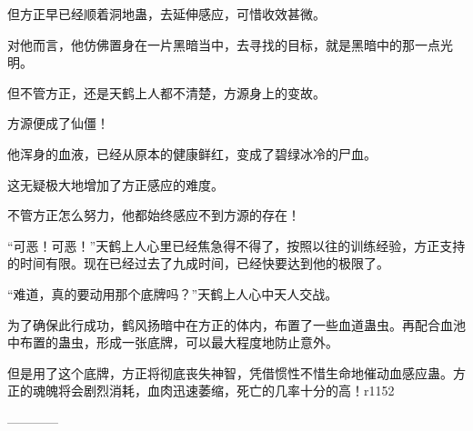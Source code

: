 \begin{this_body}
但方正早已经顺着洞地蛊，去延伸感应，可惜收效甚微。

对他而言，他仿佛置身在一片黑暗当中，去寻找的目标，就是黑暗中的那一点光明。

但不管方正，还是天鹤上人都不清楚，方源身上的变故。

方源便成了仙僵！

他浑身的血液，已经从原本的健康鲜红，变成了碧绿冰冷的尸血。

这无疑极大地增加了方正感应的难度。

不管方正怎么努力，他都始终感应不到方源的存在！

“可恶！可恶！”天鹤上人心里已经焦急得不得了，按照以往的训练经验，方正支持的时间有限。现在已经过去了九成时间，已经快要达到他的极限了。

“难道，真的要动用那个底牌吗？”天鹤上人心中天人交战。

为了确保此行成功，鹤风扬暗中在方正的体内，布置了一些血道蛊虫。再配合血池中布置的蛊虫，形成一张底牌，可以最大程度地防止意外。

但是用了这个底牌，方正将彻底丧失神智，凭借惯性不惜生命地催动血感应蛊。方正的魂魄将会剧烈消耗，血肉迅速萎缩，死亡的几率十分的高！r1152

------------

\end{this_body}

